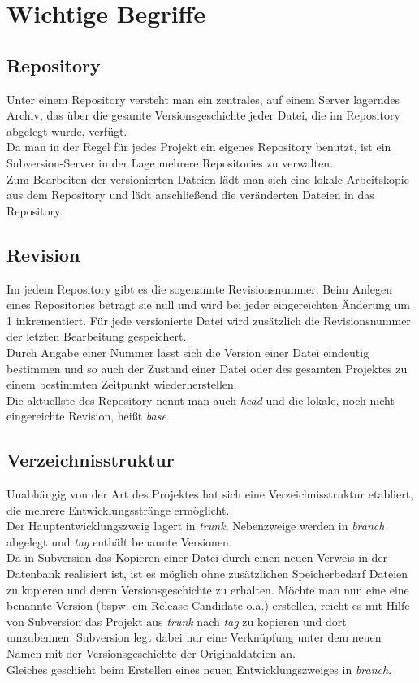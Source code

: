 \section{Wichtige Begriffe}
\subsection{Repository}
Unter einem Repository versteht man ein zentrales, auf einem Server lagerndes Archiv, das über die gesamte Versionsgeschichte jeder Datei, die im Repository abgelegt wurde, verfügt.\\
Da man in der Regel für jedes Projekt ein eigenes Repository benutzt, ist ein Subversion-Server in der Lage mehrere Repositories zu verwalten.\\
Zum Bearbeiten der versionierten Dateien lädt man sich eine lokale Arbeitskopie aus dem Repository und lädt anschließend die veränderten Dateien in das Repository.
\subsection{Revision}
Im jedem Repository gibt es die sogenannte Revisionsnummer. Beim Anlegen eines Repositories beträgt sie null und wird bei jeder eingereichten Änderung um 1 inkrementiert. Für jede versionierte Datei wird zusätzlich die Revisionsnummer der letzten Bearbeitung gespeichert.\\
Durch Angabe einer Nummer lässt sich die Version einer Datei eindeutig bestimmen und so auch der Zustand einer Datei oder des gesamten Projektes zu einem bestimmten Zeitpunkt wiederherstellen.\\
Die aktuellste des Repository nennt man auch \emph{head} und die lokale, noch nicht eingereichte Revision, heißt \emph{base}.
\subsection{Verzeichnisstruktur}
Unabhängig von der Art des Projektes hat sich eine Verzeichnisstruktur etabliert, die mehrere Entwicklungsstränge ermöglicht.\\
Der Hauptentwicklungszweig lagert in \emph{trunk}, Nebenzweige werden in \emph{branch} abgelegt und \emph{tag} enthält benannte Versionen.\\
Da in Subversion das Kopieren einer Datei durch einen neuen Verweis in der Datenbank  realisiert ist, ist es möglich ohne zusätzlichen Speicherbedarf Dateien zu kopieren und deren Versionsgeschichte zu erhalten. Möchte man nun eine eine benannte Version (bspw. ein Release Candidate o.ä.) erstellen, reicht es mit Hilfe von Subversion das Projekt aus \emph{trunk} nach \emph{tag} zu kopieren und dort umzubennen. Subversion legt dabei nur eine Verknüpfung unter dem neuen Namen mit der Versionsgeschichte der Originaldateien an.\\
Gleiches geschieht beim Erstellen eines neuen Entwicklungszweiges in \emph{branch}.
